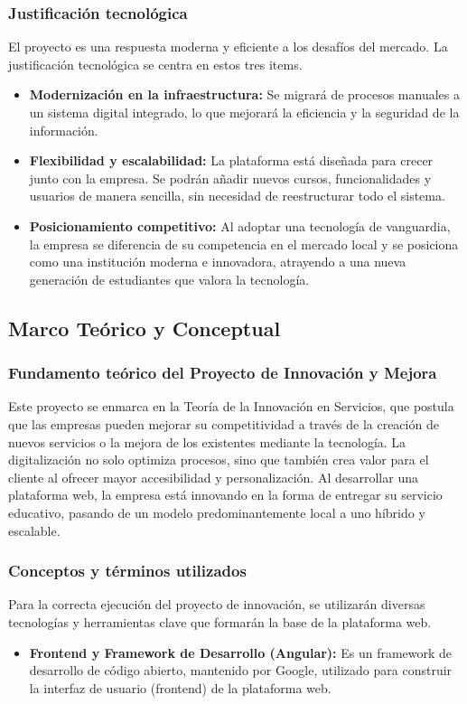 \subsubsection{Justificación tecnológica}
El proyecto es una respuesta moderna y eficiente a los desafíos del mercado. La justificación tecnológica se centra en estos tres items.
\begin{itemize}
	\item \textbf{Modernización en la infraestructura:} Se migrará de procesos manuales a un sistema digital integrado, lo que mejorará la eficiencia y la seguridad de la información.
\end{itemize}
\begin{itemize}
	\item \textbf{Flexibilidad y escalabilidad:} La plataforma está diseñada para crecer junto con la empresa. Se podrán añadir nuevos cursos, funcionalidades y usuarios de manera sencilla, sin necesidad de reestructurar todo el sistema.
\end{itemize}
\begin{itemize}
	\item \textbf{Posicionamiento competitivo:} Al adoptar una tecnología de vanguardia, la empresa se diferencia de su competencia en el mercado local y se posiciona como una institución moderna e innovadora, atrayendo a una nueva generación de estudiantes que valora la tecnología.
\end{itemize}
\subsection{Marco Teórico y Conceptual}

\subsubsection{Fundamento teórico del Proyecto de Innovación y Mejora}
Este proyecto se enmarca en la Teoría de la Innovación en Servicios, que postula que las empresas pueden mejorar su competitividad a través de la creación de nuevos servicios o la mejora de los existentes mediante la tecnología. La digitalización no solo optimiza procesos, sino que también crea valor para el cliente al ofrecer mayor accesibilidad y personalización. Al desarrollar una plataforma web, la empresa está innovando en la forma de entregar su servicio educativo, pasando de un modelo predominantemente local a uno híbrido y escalable.

\subsubsection{Conceptos y términos utilizados}
Para la correcta ejecución del proyecto de innovación, se utilizarán diversas tecnologías y herramientas clave que formarán la base de la plataforma web.
\begin{itemize}
	\item \textbf{Frontend y Framework de Desarrollo (Angular):}  Es un framework de desarrollo de código abierto, mantenido por Google, utilizado para construir la interfaz de usuario (frontend) de la plataforma web.
\end{itemize}

